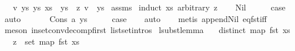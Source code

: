 \begin{isabellebody}
\ \ \ {\isachardoublequoteopen}{\isasymexists}v\ ys{}\ ys{}{\isachardot}{\kern0pt}\ {\isacharparenleft}{\kern0pt}xs\ {\isacharequal}{\kern0pt}\ ys{}\ {\isacharat}{\kern0pt}\ {\isacharbrackleft}{\kern0pt}{\isacharparenleft}{\kern0pt}z{\isacharcomma}{\kern0pt}\ v{\isacharparenright}{\kern0pt}{\isacharbrackright}{\kern0pt}\ {\isacharat}{\kern0pt}\ ys{}{\isacharparenright}{\kern0pt}{\isachardoublequoteclose}\isanewline
%
\isadelimproof
%
\endisadelimproof
%
\isatagproof
{}\isamarkupfalse%
\ assms\isanewline
{}\isamarkupfalse%
\ {\isacharparenleft}{\kern0pt}induct\ xs\ arbitrary{\isacharcolon}{\kern0pt}\ z{\isacharparenright}{\kern0pt}\isanewline
\ \ \isamarkupfalse%
\ Nil\isanewline
\ \ \isamarkupfalse%
\ \isamarkupfalse%
\ {\isacharquery}{\kern0pt}case\isanewline
\ \ \isamarkupfalse%
\ auto\isanewline
\ \ \isamarkupfalse%
\isanewline
{}\isamarkupfalse%
\isanewline
\ \ \isamarkupfalse%
\ {\isacharparenleft}{\kern0pt}Cons\ a\ ys{}{\isacharparenright}{\kern0pt}\isanewline
\ \ \isamarkupfalse%
\ \isamarkupfalse%
\ {\isacharquery}{\kern0pt}case\isanewline
\ \ \isamarkupfalse%
\ auto\isanewline
\ \ \isamarkupfalse%
\ {\isacharparenleft}{\kern0pt}metis\ append{\isacharunderscore}{\kern0pt}Nil\ eq{\isacharunderscore}{\kern0pt}fst{\isacharunderscore}{\kern0pt}iff{\isacharparenright}{\kern0pt}\isanewline
\ \ \isamarkupfalse%
\ {\isacharparenleft}{\kern0pt}meson\ in{\isacharunderscore}{\kern0pt}set{\isacharunderscore}{\kern0pt}conv{\isacharunderscore}{\kern0pt}decomp{\isacharunderscore}{\kern0pt}first\ list{\isachardot}{\kern0pt}set{\isacharunderscore}{\kern0pt}intros{\isacharparenleft}{\kern0pt}{}{\isacharparenright}{\kern0pt}{\isacharparenright}{\kern0pt}\isanewline
{}\isamarkupfalse%
%
\endisatagproof
{\isafoldproof}%
%
\isadelimproof
\isanewline
%
\endisadelimproof
\isanewline
\isanewline
{}\isamarkupfalse%
\ lsubst{\isacharunderscore}{\kern0pt}lemma{}{\isacharcolon}{\kern0pt}\isanewline
\ \ \ {\isachardoublequoteopen}distinct\ {\isacharparenleft}{\kern0pt}map\ fst\ xs{\isacharparenright}{\kern0pt}{\isachardoublequoteclose}\isanewline
\ \ \ {\isachardoublequoteopen}z\ {\isasymin}\ set\ {\isacharparenleft}{\kern0pt}map\ fst\ xs{\isacharparenright}{\kern0pt}{\isachardoublequoteclose}\isanewline

\end{isabellebody}
